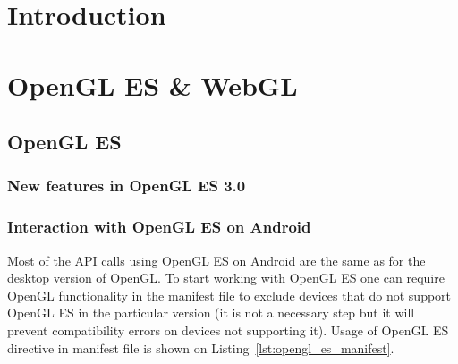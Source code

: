 \documentclass[a4paper,11pt]{article}
\renewenvironment{abstract}
{\itshape \small
  \begin{center}
  \bfseries \abstractname\vspace{-.5em}\vspace{0pt}
  \end{center}
  \list{}{
    \setlength{\leftmargin}{1.5cm}%
    \setlength{\rightmargin}{\leftmargin}%
  }%
  \item\relax}
{\endlist}
\begin{document}
\begin{abstract}
\label{Abstract}

\pagebreak




\section{Introduction} 



\pagebreak[3]
\section{OpenGL ES \& WebGL}


\subsection{OpenGL ES}

\subsubsection{New features in OpenGL ES 3.0}


\subsubsection{Interaction with OpenGL ES on Android}
Most of the API calls using OpenGL ES on Android are the same as for the desktop version of OpenGL. 
To start working with OpenGL ES one can require OpenGL functionality in the manifest file to exclude devices that do not support OpenGL ES in the particular version (it is not a necessary step but it will prevent compatibility errors on devices not supporting it).
Usage of OpenGL ES directive in manifest file is shown on Listing~\ref{lst:opengl_es_manifest}.




\end{abstract}
\end{document}
